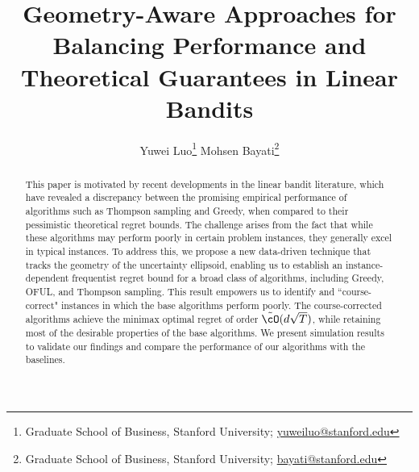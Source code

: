 \documentclass[11pt]{article}
\author{Yuwei Luo\thanks{Graduate School of Business, Stanford University; \href{mailto:yuweiluo@stanford.edu}{yuweiluo@stanford.edu} } \qquad  Mohsen Bayati\thanks{Graduate School of Business, Stanford University; \href{mailto:bayati@stanford.edu}{bayati@stanford.edu}  }}
\date{}
\title{%
Geometry-Aware Approaches for Balancing Performance and Theoretical Guarantees in Linear Bandits
}
\begin{document}
	
\maketitle
\vspace{-0.1 in}



\begin{abstract}
This paper is motivated by recent developments in the linear bandit literature, which have revealed a discrepancy between the promising empirical performance of algorithms such as Thompson sampling and Greedy, when compared to their pessimistic theoretical regret bounds. The challenge arises from the fact that while these algorithms may perform poorly in certain problem instances, they generally excel in typical instances. To address this, we propose a new data-driven technique that tracks the geometry of the uncertainty ellipsoid, enabling us to establish an instance-dependent frequentist regret bound for a broad class of algorithms, including Greedy, OFUL, and Thompson sampling. This result empowers us to identify and ``course-correct" instances in which the base algorithms perform poorly. The course-corrected algorithms achieve the minimax optimal regret of order $\tilde{\cO}(d\sqrt{T})$, while retaining most of the desirable properties of the base algorithms. We present simulation results to validate our findings and compare the performance of our algorithms with the baselines.



\end{abstract}



















\appendix


%
\end{document}
